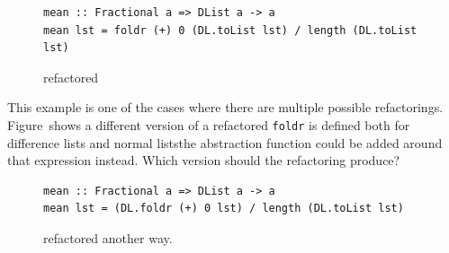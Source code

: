 \begin{figure}[t]
\DIFdelbeginFL %
\DIFdelendFL \DIFaddbeginFL \begin{lstlisting}
mean :: Fractional a => DList a -> a
mean lst = foldr (+) 0 (DL.toList lst) / length (DL.toList lst)
\end{lstlisting}  
\DIFaddendFL \caption{\DIFdelbeginFL \texttt{} %
\DIFdelendFL \DIFaddbeginFL \texttt{} \DIFaddendFL refactored}
\DIFdelbeginFL %
\DIFdelendFL \DIFaddbeginFL \label{meanRef} 
\DIFaddendFL \end{figure}

This example is one of the cases where there are multiple possible refactorings. Figure~\DIFdelbegin \DIFdel{\ref{medianRef2} }\DIFdelend \DIFaddbegin \DIFadd{\ref{meanRef2} }\DIFaddend shows a different version of a refactored \DIFdelbegin {}\DIFdelend \DIFaddbegin \texttt{}\DIFaddend \texttt{foldr} is defined both for difference lists and normal lists\DIFaddbegin \DIFadd{, }\DIFaddend the abstraction function could be added around that expression instead. Which version should the refactoring produce?

\begin{figure}[t]
\DIFdelbeginFL %
\DIFdelendFL \DIFaddbeginFL \begin{lstlisting}
mean :: Fractional a => DList a -> a
mean lst = (DL.foldr (+) 0 lst) / length (DL.toList lst)
\end{lstlisting}  
\DIFaddendFL \caption{\DIFdelbeginFL \texttt{} %
\DIFdelendFL \DIFaddbeginFL \texttt{} \DIFaddendFL refactored another way.}
\DIFdelbeginFL %
\DIFdelendFL \DIFaddbeginFL \label{meanRef2}
\DIFaddendFL \end{figure}  

